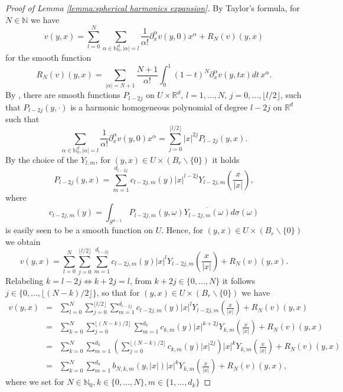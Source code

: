 \documentclass[a4paper,10pt]{amsart}
\newtheorem*{crucial lemma}{Lemma \ref{lem:nice polynomial2}}
\theoremstyle{definition}
\newcommand{\R}{\mathbb{R}}
\newcommand{\N}{\mathbb{N}}
\begin{document}
\begin{proof}[Proof of Lemma \ref{lemma:spherical harmonics expansion}]
	By Taylor's formula, for $N\in\N$ we have
	\[v(y,x)=\sum_{l=0}^N \sum_{\alpha\in\N_0^d, |\alpha|= l}\frac{1}{\alpha!}\partial_x^\alpha v(y,0)x^\alpha + R_N(v)(y,x)\]
	for the smooth function
	\begin{equation}\label{eq:Taylor rest}
		R_N(v)(y,x)=\sum_{|\alpha|=N+1} \frac{N+1}{\alpha!}\int_0^1 (1-t)^N \partial_x^\alpha v(y,tx)dt\, x^\alpha.
	\end{equation}
	By \cite[Proof of Proposition 2.49 and Corollary 2.50]{Folland1995}, there are smooth functions $P_{l-2j}$ on $U\times\R^d$, $l=1,\ldots, N$, $j=0,\ldots,\lfloor l/2\rfloor$, such that $P_{l-2j}(y,\cdot)$ is a harmonic homogeneous polynomial of degree $l-2j$ on $\R^d$ such that
	\[\sum_{\alpha\in\N_0^d, |\alpha|= l}\frac{1}{\alpha!}\partial_x^\alpha v(y,0)x^\alpha =\sum_{j=0}^{\lfloor l/2\rfloor} |x|^{2j} P_{l-2j}(y,x).\]
	By the choice of the $Y_{l,m}$, for $(y,x)\in U\times(B_r\backslash\{0\})$ it holds
	\[P_{l-2j}(y,x)=\sum_{m=1}^{d_{l-2j}} c_{l-2j,m}(y)|x|^{l-2j} Y_{l-2j,m}\left(\frac{x}{|x|}\right),\]
	where
	\[c_{l-2j,m}(y)=\int_{S^{d-1}} P_{l-2j,m}(y,\omega)\overline{Y_{l-2j,m}(\omega)}d\sigma(\omega)\]
	is easily seen to be a smooth function on $U$. Hence, for $(y,x)\in U\times(B_r\backslash\{0\})$ we obtain
	\[v(y,x)=\sum_{l=0}^N \sum_{j=0}^{\lfloor l/2\rfloor} \sum_{m=1}^{d_{l-2j}} c_{l-2j,m}(y)|x|^{l} Y_{l-2j,m}\left(\frac{x}{|x|}\right) + R_N(v)(y,x).\]
	Relabeling $k=l-2j\Leftrightarrow k+2j=l$, from $k+2j\in\{0,\ldots, N\}$ it follows $j\in\{0,\ldots,\lfloor (N-k)/2\rfloor\}$, so that for $(y,x)\in U\times(B_r\backslash\{0\})$ we have
	\begin{eqnarray}\label{eq:spherical harmonics expansion 1}
		v(y,x)&=&\sum_{l=0}^N \sum_{j=0}^{\lfloor l/2\rfloor} \sum_{m=1}^{d_{l-2j}} c_{l-2j,m}(y)|x|^{l} Y_{l-2j,m}\left(\frac{x}{|x|}\right) + R_N(v)(y,x)\nonumber\\
		&=&\sum_{k=0}^N\sum_{j=0}^{\lfloor(N-k)/2\rfloor}\sum_{m=1}^{d_k} c_{k,m}(y)|x|^{k+2j}Y_{k,m}\left(\frac{x}{|x|}\right)+R_N(v)(y,x)\nonumber\\
		&=&\sum_{k=0}^N\sum_{m=1}^{d_k}\left(\sum_{j=0}^{\lfloor(N-k)/2\rfloor} c_{k,m}(y)|x|^{2j}\right) |x|^k Y_{k,m}\left(\frac{x}{|x|}\right)+R_N(v)(y,x)\nonumber\\
		&=&\sum_{k=0}^N\sum_{m=1}^{d_k} b_{N,k,m}(y,|x|)|x|^k Y_{k,m}\left(\frac{x}{|x|}\right)+R_N(v)(y,x),
	\end{eqnarray}
	where we set for $N\in\N_0, k\in\{0,\ldots,N\}, m\in\{1,\ldots,d_k\}$

\end{proof}
\end{document}
